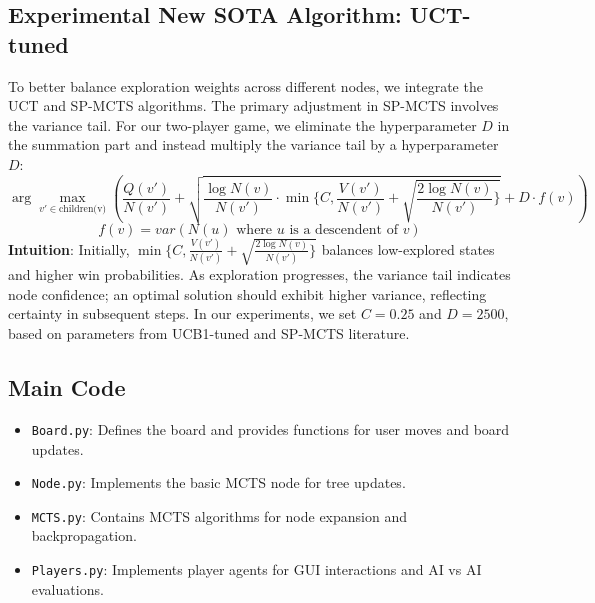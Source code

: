 \documentclass[11pt]{article}
\theoremstyle{definitionstyle}
\begin{document}
\subsection{Experimental New SOTA Algorithm: UCT-tuned}
To better balance exploration weights across different nodes, we integrate the UCT and SP-MCTS algorithms. The primary adjustment in SP-MCTS involves the variance tail. For our two-player game, we eliminate the hyperparameter $D$ in the summation part and instead multiply the variance tail by a hyperparameter $D$:
\[ 
\arg\max_{v'\in\text{children(v)}}\left(\frac{Q(v')}{N(v')}+\sqrt{\frac{\log N(v)}{N(v')}\cdot\min\{C,\frac{V(v')}{N(v')}+\sqrt{\frac{2\log N(v)}{N(v')}\}}}+D\cdot f(v)\right)
\]
\[
    f(v)=var\left(N(u)\text{ where }u\text{ is a descendent of }v\right)
\]
\textbf{Intuition}: Initially, $\min\{C,\frac{V(v')}{N(v')}+\sqrt{\frac{2\log N(v)}{N(v')}\}}$ balances low-explored states and higher win probabilities. As exploration progresses, the variance tail indicates node confidence; an optimal solution should exhibit higher variance, reflecting certainty in subsequent steps. In our experiments, we set $C=0.25$ and $D=2500$, based on parameters from UCB1-tuned and SP-MCTS literature.
\subsection{Main Code}
\begin{itemize}
    \item \texttt{Board.py}: Defines the board and provides functions for user moves and board updates.
    \item \texttt{Node.py}: Implements the basic MCTS node for tree updates.
    \item \texttt{MCTS.py}: Contains MCTS algorithms for node expansion and backpropagation.
    \item \texttt{Players.py}: Implements player agents for GUI interactions and AI vs AI evaluations.
\end{itemize}
\end{document}
